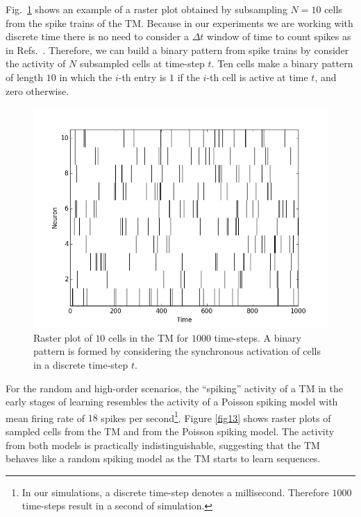 \documentclass[11pt,letterpaper]{article}
\begin{document}
			Fig.~\ref{fig12} shows an example of a raster plot obtained by subsampling $N =10$ cells from the spike trains
			of the TM.
			Because in our experiments we are working with discrete time there is no need to consider a $\Delta t$ window
			of time to count spikes as in Refs.~\cite{schneidman2006weak,berkes2011spontaneous}.
			Therefore, we can build a binary pattern from spike trains by consider the activity of $N$ subsampled cells
			at time-step $t$.
			Ten cells make a binary pattern of length $10$ in which the $i$-th entry is $1$ if the $i$-th cell is active
			at time $t$, and zero otherwise.

 		    \begin{figure}[t]
			    \centering
			    \includegraphics[scale=0.5]{rasterTM_10cells_1kTS.png}
			    \caption{
                    Raster plot of $10$ cells in the TM for $1000$ time-steps.
				    A binary pattern is formed by considering the synchronous activation
				    of cells in a discrete time-step $t$.
			    }
			    \label{fig12}
		    \end{figure}
		
			For the random and high-order scenarios, the ``spiking'' activity of a TM in the early stages of 
			learning resembles the activity of a Poisson
			spiking model with mean firing rate of $18$ spikes per second\footnote{In our
			simulations, a discrete time-step denotes a millisecond. Therefore $1000$ time-steps result in a
			second of simulation.}.
            Figure \ref{fig13} shows raster plots of sampled cells from the TM and from the Poisson spiking model.
            The activity from both models is practically indistinguishable, suggesting that the TM behaves like
            a random spiking model as the TM starts to learn sequences.
\end{document}
